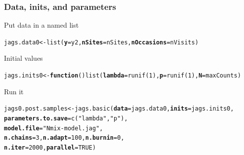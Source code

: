 \documentclass[color=usenames,dvipsnames]{beamer}\usepackage[]{graphicx}\usepackage[]{xcolor}
\makeatletter
\newcommand{\hlnum}[1]{\textcolor[rgb]{0.69,0.494,0}{#1}}%
\newcommand{\hlsng}[1]{\textcolor[rgb]{0.749,0.012,0.012}{#1}}%
\newcommand{\hldef}[1]{\textcolor[rgb]{0,0,0}{#1}}%
\newcommand{\hlkwa}[1]{\textcolor[rgb]{0,0,0}{\textbf{#1}}}%
\newcommand{\hlkwb}[1]{\textcolor[rgb]{0,0.341,0.682}{#1}}%
\newcommand{\hlkwc}[1]{\textcolor[rgb]{0,0,0}{\textbf{#1}}}%
\newcommand{\hlkwd}[1]{\textcolor[rgb]{0.004,0.004,0.506}{#1}}%
\newenvironment{kframe}{%
 \def\at@end@of@kframe{}%
 \ifinner\ifhmode%
  \def\at@end@of@kframe{\end{minipage}}%
  \begin{minipage}{\columnwidth}%
 \fi\fi%
 \def\FrameCommand##1{\hskip\@totalleftmargin \hskip-\fboxsep
 \colorbox{shadecolor}{##1}\hskip-\fboxsep
     \hskip-\linewidth \hskip-\@totalleftmargin \hskip\columnwidth}%
 \MakeFramed {\advance\hsize-\width
   \@totalleftmargin\z@ \linewidth\hsize
   \@setminipage}}%
 {\par\unskip\endMakeFramed%
 \at@end@of@kframe}
\newenvironment{knitrout}{}{} %
\let\hlstd\hldef
\let\hlstr\hlsng
\makeatother
\begin{document}
\begin{frame}[fragile]
  \frametitle{Data, inits, and parameters}
  Put data in a named list
  \vspace{-6pt}
\begin{knitrout}\scriptsize
{}\color{fgcolor}\begin{kframe}
\begin{alltt}
\hldef{jags.data0} \hlkwb{<-} \hlkwd{list}\hldef{(}\hlkwc{y}\hldef{=y2,} \hlkwc{nSites}\hldef{=nSites,} \hlkwc{nOccasions}\hldef{=nVisits)}
\end{alltt}
\end{kframe}
\end{knitrout}
  \vfill
  Initial values
  \vspace{-6pt}
\begin{knitrout}\scriptsize
{}\color{fgcolor}\begin{kframe}
\begin{alltt}
\hldef{jags.inits0} \hlkwb{<-} \hlkwa{function}\hldef{()} \hlkwd{list}\hldef{(}\hlkwc{lambda}\hldef{=}\hlkwd{runif}\hldef{(}\hlnum{1}\hldef{),} \hlkwc{p}\hldef{=}\hlkwd{runif}\hldef{(}\hlnum{1}\hldef{),} \hlkwc{N}\hldef{=maxCounts)}
\end{alltt}
\end{kframe}
\end{knitrout}
  \pause
  \vfill
  Run it
  \vspace{-6pt}
\begin{knitrout}\scriptsize
{}\color{fgcolor}\begin{kframe}
\begin{alltt}
\hlstd{jags0.post.samples} \hlkwb{<-} \hlkwd{jags.basic}\hlstd{(}\hlkwc{data}\hlstd{=jags.data0,} \hlkwc{inits}\hlstd{=jags.inits0,}
                                 \hlkwc{parameters.to.save}\hlstd{=}\hlkwd{c}\hlstd{(}\hlstr{"lambda"}\hlstd{,} \hlstr{"p"}\hlstd{),}
                                 \hlkwc{model.file}\hlstd{=}\hlstr{"Nmix-model.jag"}\hlstd{,}
                                 \hlkwc{n.chains}\hlstd{=}\hlnum{3}\hlstd{,} \hlkwc{n.adapt}\hlstd{=}\hlnum{100}\hlstd{,} \hlkwc{n.burnin}\hlstd{=}\hlnum{0}\hlstd{,}
                                 \hlkwc{n.iter}\hlstd{=}\hlnum{2000}\hlstd{,} \hlkwc{parallel}\hlstd{=}\hlnum{TRUE}\hlstd{)}
\end{alltt}
\end{kframe}
\end{knitrout}
\end{frame}
\end{document}
